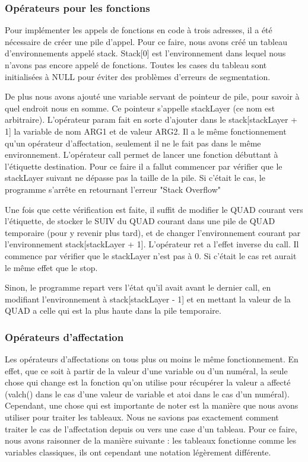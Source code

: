 \documentclass{article}
\begin{document}
\subsubsection{Opérateurs pour les fonctions}

Pour implémenter les appels de fonctions en code à trois adresses, il a été nécessaire de créer une pile d'appel.
Pour ce faire, nous avons créé un tableau d'environnements appelé stack. Stack[0] est l'environnement dans lequel nous n'avons pas encore appelé de fonctions.
Toutes les cases du tableau sont initialisées à NULL pour éviter des problèmes d'erreurs de segmentation.

De plus nous avons ajouté une variable servant de pointeur de pile, pour savoir à quel endroit nous en somme. Ce pointeur s'appelle stackLayer (ce nom est arbitraire).
\bigbreak
L'opérateur param fait en sorte d'ajouter dans le stack[stackLayer + 1] la variable de nom ARG1 et de valeur ARG2. Il a le même fonctionnement qu'un opérateur d'affectation, seulement il ne le fait pas dans le même environnement.
\medbreak
L'opérateur call permet de lancer une fonction débuttant à l'étiquette destination. Pour ce faire il a fallut commencer par vérifier que le stackLayer suivant ne dépasse pas la taille de la pile.
Si c'était le cas, le programme s'arrête en retournant l'erreur "Stack Overflow"

Une fois que cette vérification est faite, il suffit de modifier le QUAD courant vers l'étiquette, de stocker le SUIV du QUAD courant dans une pile de QUAD temporaire (pour y revenir plus tard), et de changer l'environnement courant par l'environnement stack[stackLayer + 1].
\medbreak
L'opérateur ret a l'effet inverse du call. Il commence par vérifier que le stackLayer n'est pas à 0. Si c'était le cas ret aurait le même effet que le stop.

Sinon, le programme repart vers l'état qu'il avait avant le dernier call, en modifiant l'environnement à stack[stackLayer - 1] et en mettant la valeur de la QUAD a celle qui est la plus haute dans la pile temporaire.

\subsubsection{Opérateurs d'affectation}

Les opérateurs d'affectations on tous plus ou moins le même fonctionnement. En effet, que ce soit à partir de la valeur d'une variable ou d'un numéral, la seule chose qui change est la fonction qu'on utilise pour récupérer la valeur a affecté (valch() dans le cas d'une valeur de variable et atoi dans le cas d'un numéral).
Cependant, une chose qui est importante de noter est la manière que nous avons utiliser pour traiter les tableaux.
\medbreak
Nous ne savions pas exactement comment traiter le cas de l'affectation depuis ou vers une case d'un tableau.
Pour ce faire, nous avons raisonner de la manière suivante : les tableaux fonctionne comme les variables classiques, ils ont cependant une notation légèrement différente.
\end{document}
